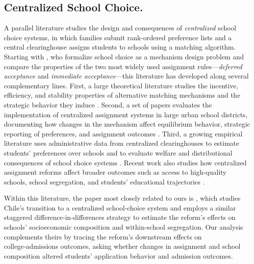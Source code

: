 \documentclass[11pt]{article}
\begin{document}
\subsection{Centralized School Choice.}
A parallel literature studies the design and consequences of \emph{centralized} school choice systems, in which families submit rank-ordered preference lists and a central clearinghouse assigns students to schools using a matching algorithm. Starting with \citet{abdulkadiroglu2003}, who formalize school choice as a mechanism design problem and compare the properties of the two most widely used assignment rules—\emph{deferred acceptance} and \emph{immediate acceptance}—this literature has developed along several complementary lines. 
First, a large theoretical literature studies the incentive, efficiency, and stability properties of alternative matching mechanisms and the strategic behavior they induce \citep{abdulkadiroglu2003,kesten2010,pathak2017}. Second, a set of papers evaluates the implementation of centralized assignment systems in large urban school districts, documenting how changes in the mechanism affect equilibrium behavior, strategic reporting of preferences, and assignment outcomes \citep{abdulkadiroglu2005,abdulkadiroglu2009}. Third, a growing empirical literature uses administrative data from centralized clearinghouses to estimate students’ preferences over schools and to evaluate welfare and distributional consequences of school choice systems \citep{hastings2008,agarwal2018}. Recent work also studies how centralized assignment reforms affect broader outcomes such as access to high-quality schools, school segregation, and students’ educational trajectories \citep{neilson2021, gazmuri2024}. 

Within this literature, the paper most closely related to ours is \cite{urzua2023}, which studies Chile’s transition to a centralized school‑choice system and employs a similar staggered difference‑in‑differences strategy to estimate the reform's effects on schools' socioeconomic composition and within‑school segregation. Our analysis complements theirs by tracing the reform's downstream effects on college‑admissions outcomes, asking whether changes in assignment and school composition altered students' application behavior and admission outcomes.

\end{document}
